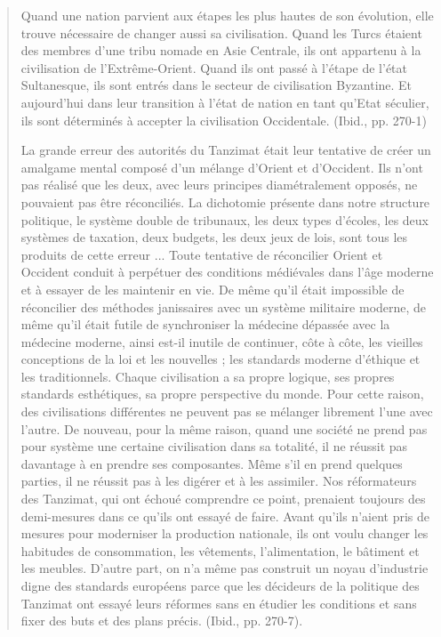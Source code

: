 \begin{quote}
Quand une nation parvient aux étapes les plus hautes de son évolution,
elle trouve nécessaire de changer aussi sa civilisation. Quand les Turcs
étaient des membres d'une tribu nomade en Asie Centrale, ils ont
appartenu à la civilisation de l'Extrême-Orient. Quand ils ont passé à
l'étape de l'état Sultanesque, ils sont entrés dans le secteur de
civilisation Byzantine. Et aujourd'hui dans leur transition à l'état de
nation en tant qu'Etat séculier, ils sont déterminés à accepter la
civilisation Occidentale. (Ibid., pp. 270-1)

La grande erreur des autorités du Tanzimat était leur
tentative de créer un amalgame mental composé d'un mélange d'Orient et
d'Occident. Ils n'ont pas réalisé que les deux, avec leurs principes
diamétralement opposés, ne pouvaient pas être réconciliés. La dichotomie
présente dans notre structure politique, le système double de tribunaux,
les deux types d'écoles, les deux systèmes de taxation, deux budgets,
les deux jeux de lois, sont tous les produits de cette erreur ... Toute
tentative de réconcilier Orient et Occident conduit à perpétuer des
conditions médiévales dans l'âge moderne et à essayer de les maintenir
en vie. De même qu'il était impossible de réconcilier des méthodes
janissaires avec un système militaire moderne, de même qu'il était
futile de synchroniser la médecine dépassée avec la médecine moderne,
ainsi est-il inutile de continuer, côte à côte, les vieilles conceptions
de la loi et les nouvelles ; les standards moderne d'éthique et les
traditionnels. Chaque civilisation a sa propre logique, ses propres
standards esthétiques, sa propre perspective du monde. Pour cette
raison, des civilisations différentes ne peuvent pas se mélanger
librement l'une avec l'autre. De nouveau, pour la même raison, quand une
société ne prend pas pour système une certaine civilisation dans sa
totalité, il ne réussit pas davantage à en prendre ses composantes. Même
s'il en prend quelques parties, il ne réussit pas à les digérer et à les
assimiler. Nos réformateurs des Tanzimat, qui ont échoué comprendre ce
point, prenaient toujours des demi-mesures dans ce qu'ils ont essayé de
faire. Avant qu'ils n'aient pris de mesures pour moderniser la
production nationale, ils ont voulu changer les habitudes de
consommation, les vêtements, l'alimentation, le bâtiment et les meubles.
D'autre part, on n'a même pas construit un noyau d'industrie digne des
standards européens parce que
les décideurs de la politique des Tanzimat ont essayé leurs réformes
sans en étudier les conditions et sans fixer des buts et des plans
précis. (Ibid., pp. 270-7).


\end{quote}
